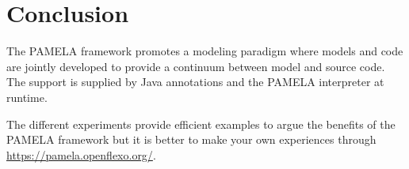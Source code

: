
\section{Conclusion}

The PAMELA framework promotes a modeling paradigm where models and code are jointly developed to provide a continuum between model and source code. The support is supplied by Java annotations and the PAMELA interpreter at runtime.

The different experiments provide efficient examples to argue the benefits of
the PAMELA framework but it is better to make your own experiences through \url{https://pamela.openflexo.org/}.
